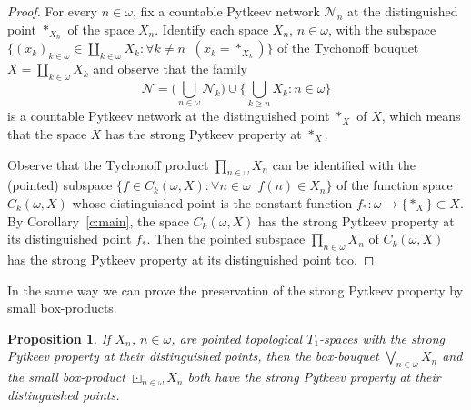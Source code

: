 \documentclass{amsart}
\newtheorem{proposition}[theorem]{Proposition}
\theoremstyle{definition}
\begin{document}
\begin{proof} For every $n\in{\omega}$, fix a countable Pytkeev network $\mathcal N_n$ at the distinguished point $*_{X_n}$ of the space $X_n$. Identify each space $X_n$, $n\in{\omega}$, with the subspace
 $\big\{(x_k)_{k\in{\omega}}\in\coprod_{k\in{\omega}}X_k:\forall k\ne n\;\; (x_k=*_{X_k})\big\}$ of the Tychonoff bouquet $X=\coprod_{k\in{\omega}}X_k$  and observe that the family $$\mathcal N=\big(\bigcup_{n\in{\omega}}\mathcal N_k\big)\cup \big\{\textstyle{\bigcup_{k\ge n}X_k:n\in{\omega}}\big\}$$ is a countable Pytkeev network at the distinguished point $*_X$ of $X$, which means that the space $X$ has the strong Pytkeev property at $*_X$.

Observe that the Tychonoff product $\prod_{n\in{\omega}}X_n$ can be identified with the (pointed) subspace $\{f\in C_k({\omega},X):\forall n\in{\omega}\;\;f(n)\in X_n\}$ of the function space $C_k({\omega},X)$ whose distinguished point is the constant function $f_*:{\omega}\to\{*_X\}\subset X$. By Corollary~\ref{c:main}, the space $C_k({\omega},X)$ has the strong Pytkeev property at its distinguished point $f_*$. Then the pointed subspace $\prod_{n\in{\omega}}X_n$ of  $C_k({\omega},X)$ has the strong Pytkeev property at its distinguished point too.
\end{proof}

In the same way we can prove the preservation of the strong Pytkeev property by small box-products.

\begin{proposition} If $X_n$, $n\in{\omega}$, are pointed topological $T_1$-spaces with the strong Pytkeev property at their distinguished points, then
the box-bouquet $\bigvee_{n\in{\omega}}X_n$ and the small box-product ${\boxdot}_{n\in{\omega}}X_n$ both have the strong Pytkeev property at their distinguished points.
\end{proposition}
\end{document}
